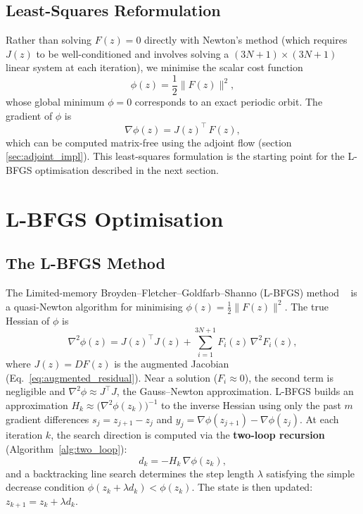 \documentclass[11pt,a4paper]{article}
\begin{document}
\subsection{Least-Squares Reformulation}
Rather than solving $F(z) = 0$ directly with Newton's method (which requires
$J(z)$ to be well-conditioned and involves solving a $(3N+1) \times (3N+1)$
linear system at each iteration), we minimise the scalar cost function
\begin{equation}\label{eq:cost}
  \phi(z) = \frac{1}{2}\bigl\|F(z)\bigr\|^2,
\end{equation}
whose global minimum $\phi = 0$ corresponds to an exact periodic orbit.  The
gradient of $\phi$ is
\begin{equation}\label{eq:gradient}
  \nabla\phi(z) = J(z)^{\top}\,F(z),
\end{equation}
which can be computed matrix-free using the adjoint flow (section \ref{sec:adjoint_impl}).
This least-squares formulation is the starting point for the L-BFGS
optimisation described in the next section.

\section{L-BFGS Optimisation}\label{sec:lbfgs}

\subsection{The L-BFGS Method}
The Limited-memory Broyden--Fletcher--Goldfarb--Shanno (L-BFGS) method
~\cite{nocedal2006numerical,liu1989limited} is a quasi-Newton algorithm for
minimising $\phi(z) = \frac{1}{2}\|F(z)\|^2$.  The true Hessian of $\phi$
is
\begin{equation}\label{eq:hessian}
  \nabla^2\phi(z) = J(z)^\top J(z)
  + \sum_{i=1}^{3N+1} F_i(z)\,\nabla^2 F_i(z),
\end{equation}
where $J(z) = DF(z)$ is the augmented Jacobian (Eq.~\ref{eq:augmented_residual}).
Near a solution ($F_i \approx 0$), the second term is negligible and
$\nabla^2\phi \approx J^\top J$, the Gauss--Newton approximation.
L-BFGS builds an approximation
$H_k \approx \bigl(\nabla^2 \phi(z_k)\bigr)^{-1}$
to the inverse Hessian using only the past $m$ gradient differences
$s_j = z_{j+1} - z_j$ and
$y_j = \nabla\phi(z_{j+1}) - \nabla\phi(z_j)$.
At each iteration $k$, the search direction is computed via the \textbf{two-loop
recursion} (Algorithm~\ref{alg:two_loop}):
\begin{equation}\label{eq:lbfgs_direction}
  d_k = -H_k\,\nabla\phi(z_k),
\end{equation}
and a backtracking line search determines the step length
$\lambda$ satisfying the simple decrease condition
$\phi(z_k + \lambda d_k) < \phi(z_k)$.  The state is then updated:
$z_{k+1} = z_k + \lambda d_k$.
\end{document}
